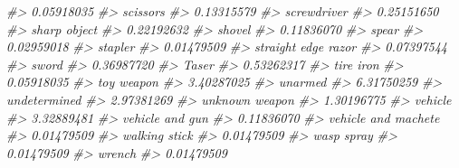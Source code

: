 \documentclass[
]{krantz}
\makeatletter
\newenvironment{Shaded}{\begin{snugshade}}{\end{snugshade}}
\newcommand{\CommentTok}[1]{\textcolor[rgb]{0.37,0.37,0.37}{\textit{#1}}}
\newenvironment{kframe}{%
\medskip{}
\setlength{\fboxsep}{.8em}
 \def\at@end@of@kframe{}%
 \ifinner\ifhmode%
  \def\at@end@of@kframe{\end{minipage}}%
  \begin{minipage}{\columnwidth}%
 \fi\fi%
 \def\FrameCommand##1{\hskip\@totalleftmargin \hskip-\fboxsep
 \colorbox{shadecolor}{##1}\hskip-\fboxsep
     \hskip-\linewidth \hskip-\@totalleftmargin \hskip\columnwidth}%
 \MakeFramed {\advance\hsize-\width
   \@totalleftmargin\z@ \linewidth\hsize
   \@setminipage}}%
 {\par\unskip\endMakeFramed%
 \at@end@of@kframe}
\renewenvironment{Shaded}{\begin{kframe}}{\end{kframe}}
\makeatother
\begin{document}
\begin{Shaded}
\begin{Highlighting}[]
\CommentTok{\#\textgreater{}                       0.05918035 }
\CommentTok{\#\textgreater{}                         scissors }
\CommentTok{\#\textgreater{}                       0.13315579 }
\CommentTok{\#\textgreater{}                      screwdriver }
\CommentTok{\#\textgreater{}                       0.25151650 }
\CommentTok{\#\textgreater{}                     sharp object }
\CommentTok{\#\textgreater{}                       0.22192632 }
\CommentTok{\#\textgreater{}                           shovel }
\CommentTok{\#\textgreater{}                       0.11836070 }
\CommentTok{\#\textgreater{}                            spear }
\CommentTok{\#\textgreater{}                       0.02959018 }
\CommentTok{\#\textgreater{}                          stapler }
\CommentTok{\#\textgreater{}                       0.01479509 }
\CommentTok{\#\textgreater{}              straight edge razor }
\CommentTok{\#\textgreater{}                       0.07397544 }
\CommentTok{\#\textgreater{}                            sword }
\CommentTok{\#\textgreater{}                       0.36987720 }
\CommentTok{\#\textgreater{}                            Taser }
\CommentTok{\#\textgreater{}                       0.53262317 }
\CommentTok{\#\textgreater{}                        tire iron }
\CommentTok{\#\textgreater{}                       0.05918035 }
\CommentTok{\#\textgreater{}                       toy weapon }
\CommentTok{\#\textgreater{}                       3.40287025 }
\CommentTok{\#\textgreater{}                          unarmed }
\CommentTok{\#\textgreater{}                       6.31750259 }
\CommentTok{\#\textgreater{}                     undetermined }
\CommentTok{\#\textgreater{}                       2.97381269 }
\CommentTok{\#\textgreater{}                   unknown weapon }
\CommentTok{\#\textgreater{}                       1.30196775 }
\CommentTok{\#\textgreater{}                          vehicle }
\CommentTok{\#\textgreater{}                       3.32889481 }
\CommentTok{\#\textgreater{}                  vehicle and gun }
\CommentTok{\#\textgreater{}                       0.11836070 }
\CommentTok{\#\textgreater{}              vehicle and machete }
\CommentTok{\#\textgreater{}                       0.01479509 }
\CommentTok{\#\textgreater{}                    walking stick }
\CommentTok{\#\textgreater{}                       0.01479509 }
\CommentTok{\#\textgreater{}                       wasp spray }
\CommentTok{\#\textgreater{}                       0.01479509 }
\CommentTok{\#\textgreater{}                           wrench }
\CommentTok{\#\textgreater{}                       0.01479509}
\end{Highlighting}
\end{Shaded}
\end{document}
